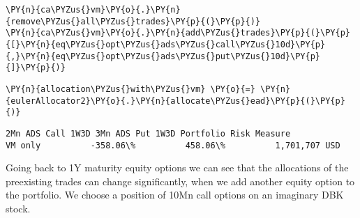     \begin{tcolorbox}[breakable, size=fbox, boxrule=1pt, pad at break*=1mm,colback=cellbackground, colframe=cellborder]
\begin{Verbatim}[commandchars=\\\{\}]
\PY{n}{ca\PYZus{}vm}\PY{o}{.}\PY{n}{remove\PYZus{}all\PYZus{}trades}\PY{p}{(}\PY{p}{)}
\PY{n}{ca\PYZus{}vm}\PY{o}{.}\PY{n}{add\PYZus{}trades}\PY{p}{(}\PY{p}{[}\PY{n}{eq\PYZus{}opt\PYZus{}ads\PYZus{}call\PYZus{}10d}\PY{p}{,}\PY{n}{eq\PYZus{}opt\PYZus{}ads\PYZus{}put\PYZus{}10d}\PY{p}{]}\PY{p}{)}
\end{Verbatim}
\end{tcolorbox}

    \begin{tcolorbox}[breakable, size=fbox, boxrule=1pt, pad at break*=1mm,colback=cellbackground, colframe=cellborder]
\begin{Verbatim}[commandchars=\\\{\}]
\PY{n}{allocation\PYZus{}with\PYZus{}vm} \PY{o}{=} \PY{n}{eulerAllocator2}\PY{o}{.}\PY{n}{allocate\PYZus{}ead}\PY{p}{(}\PY{p}{)}
\end{Verbatim}
\end{tcolorbox}

            \begin{tcolorbox}[breakable, size=fbox, boxrule=.5pt, pad at break*=1mm, opacityfill=0]
\begin{Verbatim}[commandchars=\\\{\}]
        2Mn ADS Call 1W3D 3Mn ADS Put 1W3D Portfolio Risk Measure
VM only          -358.06\%          458.06\%          1,701,707 USD
\end{Verbatim}
\end{tcolorbox}
        
    Going back to 1Y maturity equity options we can see that the allocations
of the preexisting trades can change significantly, when we add another
equity option to the portfolio. We choose a position of 10Mn call
options on an imaginary DBK stock.

